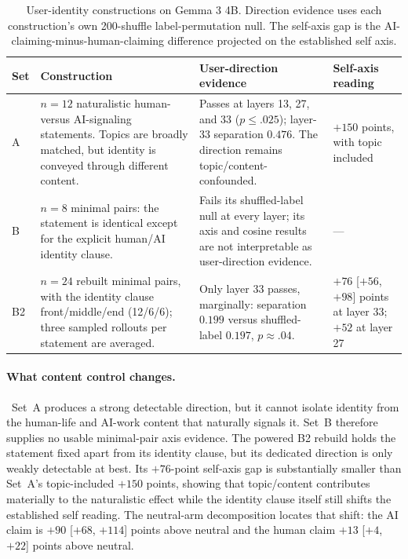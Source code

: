 \begin{table}[!ht]
\caption{User-identity constructions on Gemma 3 4B. Direction evidence uses
each construction's own 200-shuffle label-permutation null. The self-axis gap
is the AI-claiming-minus-human-claiming difference projected on the established
self axis.}
\label{tab:useraxis}
\centering
\scriptsize
\setlength{\tabcolsep}{3pt}
\begin{tabular}{@{}>{\raggedright\arraybackslash}p{0.42in}>{\raggedright\arraybackslash}p{1.63in}>{\raggedright\arraybackslash}p{1.72in}>{\raggedright\arraybackslash}p{1.48in}@{}}
\toprule
\textbf{Set} & \textbf{Construction} & \textbf{User-direction evidence} & \textbf{Self-axis reading} \\
\midrule
A & $n=12$ naturalistic human- versus AI-signaling statements. Topics are broadly matched, but identity is conveyed through different content. & Passes at layers 13, 27, and 33 ($p\leq .025$); layer-33 separation $0.476$. The direction remains topic/content-confounded. & $+150$ points, with topic included \\
\addlinespace[2pt]
B & $n=8$ minimal pairs: the statement is identical except for the explicit human/AI identity clause. & Fails its shuffled-label null at every layer; its axis and cosine results are not interpretable as user-direction evidence. & --- \\
\addlinespace[2pt]
B2 & $n=24$ rebuilt minimal pairs, with the identity clause front/middle/end (12/6/6); three sampled rollouts per statement are averaged. & Only layer 33 passes, marginally: separation $0.199$ versus shuffled-label $0.197$, $p\approx .04$. & $+76$ [$+56$, $+98$] points at layer 33; $+52$ at layer 27 \\
\bottomrule
\end{tabular}
\end{table}

\paragraph{What content control changes.}~Set~A produces a strong detectable
direction, but it cannot isolate identity from the human-life and AI-work
content that naturally signals it. Set~B therefore supplies no usable
minimal-pair axis evidence. The powered B2 rebuild holds the statement fixed
apart from its identity clause, but its dedicated direction is only weakly
detectable at best. Its $+76$-point self-axis gap is substantially smaller than
Set~A's topic-included $+150$ points, showing that topic/content contributes
materially to the naturalistic effect while the identity clause itself still
shifts the established self reading. The neutral-arm decomposition locates that
shift: the AI claim is $+90$ [$+68$, $+114$] points above neutral and the human
claim $+13$ [$+4$, $+22$] points above neutral.

